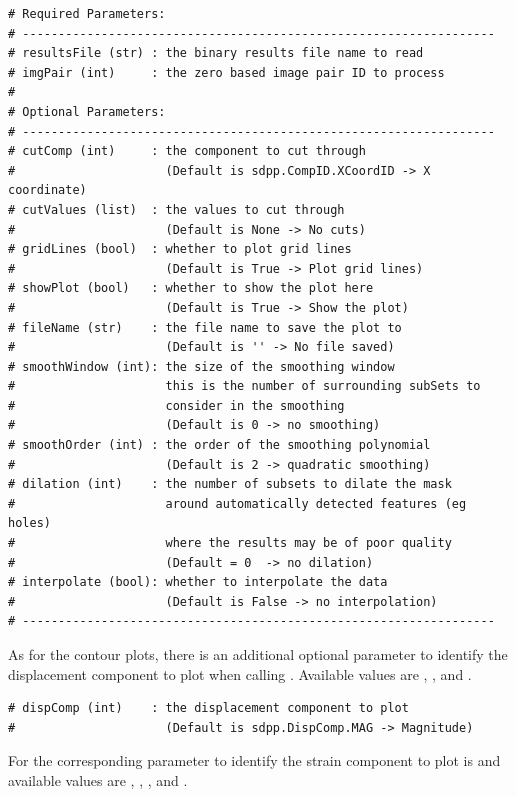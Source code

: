 \begin{lstlisting}
# Required Parameters:
# ------------------------------------------------------------------
# resultsFile (str) : the binary results file name to read
# imgPair (int)     : the zero based image pair ID to process
# 
# Optional Parameters:
# ------------------------------------------------------------------
# cutComp (int)     : the component to cut through
#                     (Default is sdpp.CompID.XCoordID -> X coordinate)
# cutValues (list)  : the values to cut through
#                     (Default is None -> No cuts)
# gridLines (bool)  : whether to plot grid lines
#                     (Default is True -> Plot grid lines)
# showPlot (bool)   : whether to show the plot here
#                     (Default is True -> Show the plot)
# fileName (str)    : the file name to save the plot to
#                     (Default is '' -> No file saved)
# smoothWindow (int): the size of the smoothing window
#                     this is the number of surrounding subSets to 
#                     consider in the smoothing
#                     (Default is 0 -> no smoothing)
# smoothOrder (int) : the order of the smoothing polynomial
#                     (Default is 2 -> quadratic smoothing)
# dilation (int)    : the number of subsets to dilate the mask 
#                     around automatically detected features (eg holes) 
#                     where the results may be of poor quality 
#                     (Default = 0  -> no dilation)
# interpolate (bool): whether to interpolate the data
#                     (Default is False -> no interpolation)
# ------------------------------------------------------------------
\end{lstlisting}

\newpage
As for the contour plots, there is an additional optional parameter  to identify the displacement component to plot when calling .  Available  values are , , and .

\begin{lstlisting}
# dispComp (int)    : the displacement component to plot
#                     (Default is sdpp.DispComp.MAG -> Magnitude)
\end{lstlisting}

For  the corresponding parameter to identify the strain component to plot is  and available  values are  , , , and .

